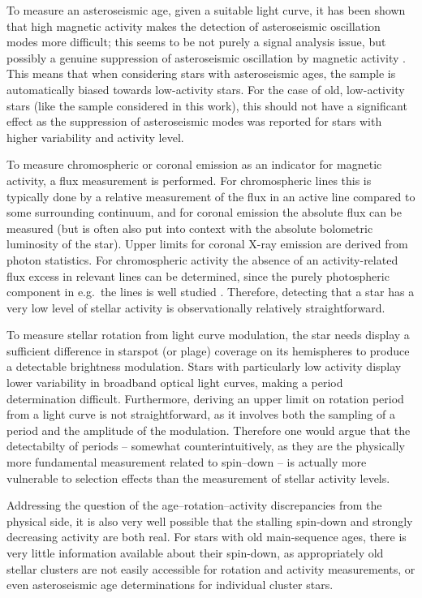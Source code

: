 To measure an asteroseismic age, given a suitable light curve, it has been shown that high magnetic activity makes the detection of asteroseismic oscillation modes more difficult; this seems to be not purely a signal analysis issue, but possibly a genuine suppression of asteroseismic oscillation by magnetic activity \citep{Chaplin_etal_2011_stellar_activity}. This means that when considering stars with asteroseismic ages, the sample is automatically biased towards low-activity stars. For the case of old, low-activity stars (like the sample considered in this work), this should not have a significant effect as the suppression of asteroseismic modes was reported for stars with higher variability and activity level.

To measure chromospheric or coronal emission as an indicator for magnetic activity, a flux measurement is performed. For chromospheric lines this is typically done by a relative measurement of the flux in an active line compared to some surrounding continuum, and for coronal emission the absolute flux can be measured (but is often also put into context with the absolute bolometric luminosity of the star). Upper limits for coronal X-ray emission are derived from photon statistics. For chromospheric activity the absence of an activity-related flux excess in relevant lines can be determined, since the purely photospheric component in e.g.\ the \caII lines is well studied \citep{Noyes_etal_1984}. Therefore, detecting that a star has a very low level of stellar activity is observationally relatively straightforward.

To measure stellar rotation from light curve modulation, the star needs display a sufficient difference in starspot (or plage) coverage on its hemispheres to produce a detectable brightness modulation. Stars with particularly low activity display lower variability in broadband optical light curves, making a period determination difficult. Furthermore, deriving an upper limit on rotation period from a light curve is not straightforward, as it involves both the sampling of a period and the amplitude of the modulation. Therefore one would argue that the detectabilty of periods -- somewhat counterintuitively, as they are the physically more fundamental measurement related to spin--down -- is actually more vulnerable to selection effects than the measurement of stellar activity levels.

Addressing the question of the age--rotation--activity discrepancies from the physical side, it is also very well possible that the stalling spin-down and strongly decreasing activity are both real. For stars with old main-sequence ages, there is very little information available about their spin-down, as appropriately old stellar clusters are not easily accessible for rotation and activity measurements, or even asteroseismic age determinations for individual cluster stars. 

